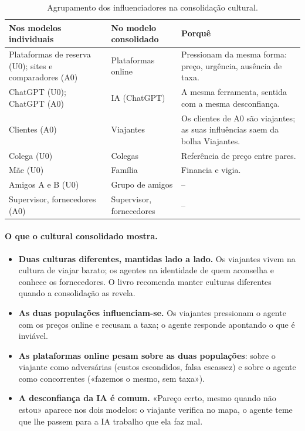 \begin{table}[!htbp]
\centering\small
\begin{tabularx}{\textwidth}{@{}p{4.4cm}p{3.4cm}L@{}}
\toprule
\textbf{Nos modelos individuais} & \textbf{No modelo consolidado} & \textbf{Porquê} \\
\midrule
Plataformas de reserva (U0); sites e comparadores (A0) & Plataformas online & Pressionam da mesma forma: preço, urgência, ausência de taxa. \\
ChatGPT (U0); ChatGPT (A0) & IA (ChatGPT) & A mesma ferramenta, sentida com a mesma desconfiança. \\
Clientes (A0) & Viajantes & Os clientes de A0 são viajantes; as suas influências saem da bolha Viajantes. \\
Colega (U0) & Colegas & Referência de preço entre pares. \\
Mãe (U0) & Família & Financia e vigia. \\
Amigos A e B (U0) & Grupo de amigos & -- \\
Supervisor, fornecedores (A0) & Supervisor, fornecedores & -- \\
\bottomrule
\end{tabularx}
\caption{Agrupamento dos influenciadores na consolidação cultural.}
\label{tab:agrup-cult}
\end{table}

\paragraph{O que o cultural consolidado mostra.}
\begin{itemize}
  \item \textbf{Duas culturas diferentes, mantidas lado a lado.} Os viajantes vivem na cultura de viajar barato; os agentes na identidade de quem aconselha e conhece os fornecedores. O livro recomenda manter culturas diferentes quando a consolidação as revela.
  \item \textbf{As duas populações influenciam-se.} Os viajantes pressionam o agente com os preços online e recusam a taxa; o agente responde apontando o que é inviável.
  \item \textbf{As plataformas online pesam sobre as duas populações}: sobre o viajante como adversárias (custos escondidos, falsa escassez) e sobre o agente como concorrentes («fazemos o mesmo, sem taxa»).
  \item \textbf{A desconfiança da IA é comum.} «Pareço certo, mesmo quando não estou» aparece nos dois modelos: o viajante verifica no mapa, o agente teme que lhe passem para a IA trabalho que ela faz mal.
\end{itemize}

